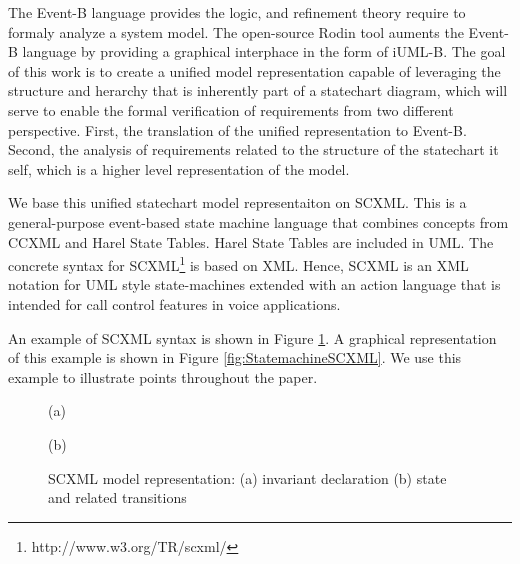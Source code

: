 \documentclass{easychair}
\begin{document}
The Event-B language provides the logic, and refinement
theory require to formaly analyze a system model. The 
open-source Rodin tool auments the Event-B language by 
providing a graphical interphace in the form of
iUML-B. The goal of this work is to create a unified model 
representation capable of leveraging the structure and 
herarchy that is inherently part of a statechart 
diagram, which will serve to enable the formal verification
of requirements from two different  perspective. First, 
the translation of the unified representation to Event-B. Second,
the analysis of requirements related to the structure of 
the statechart it self, which is a higher level representation 
of the model. 

We base this unified statechart model representaiton 
on SCXML.  This is a general-purpose event-based state machine 
language that combines concepts from CCXML and Harel 
State Tables. Harel State Tables are included in UML. 
The concrete syntax for SCXML\footnote{http://www.w3.org/TR/scxml/} 
is based on XML. Hence, SCXML is an XML notation for 
UML style state-machines extended with an action 
language that is intended for call control features 
in voice applications.

An example of SCXML syntax is shown in Figure \ref{fig:scxml}. 
A graphical representation of this example is shown in Figure  \ref{fig:StatemachineSCXML}. 
We use this example to illustrate points throughout the paper.


% 



\begin{figure}[tbp!]
  \begin{center}(a)\end{center}
  \begin{center}(b)\end{center}
  \caption{SCXML model representation: (a) invariant declaration (b) state and related transitions } 
  \label{fig:scxml}
\end{figure}
\end{document}
